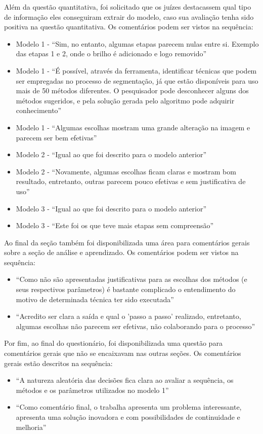 \documentclass[12pt,oneside,a4paper,english,french,spanish,brazil,]{abntex2}
\begin{document}
Além da questão quantitativa, foi solicitado que os juízes destacassem qual tipo de informação eles conseguiram extrair do modelo, caso sua avaliação tenha sido positiva na questão quantitativa. Os comentários podem ser vistos na sequência:
\begin{itemize}
    \item Modelo 1 - ``Sim, no entanto, algumas etapas parecem nulas entre si. Exemplo das etapas 1 e 2, onde o brilho é adicionado e logo removido''
    \item Modelo 1 - ``É possível, através da ferramenta, identificar técnicas que podem ser empregadas no processo de segmentação, já que estão disponíveis para uso mais de 50 métodos diferentes. O pesquisador pode desconhecer alguns dos métodos sugeridos, e pela solução gerada pelo algoritmo pode adquirir conhecimento''
    \item Modelo 1 - ``Algumas escolhas mostram uma grande alteração na imagem e parecem ser bem efetivas''
    \item Modelo 2 - ``Igual ao que foi descrito para o modelo anterior''
    \item Modelo 2 - ``Novamente, algumas escolhas ficam claras e mostram bom resultado, entretanto, outras parecem pouco efetivas e sem justificativa de uso''
    \item Modelo 3 - ``Igual ao que foi descrito para o modelo anterior''
    \item Modelo 3 - ``Este foi os que teve mais etapas sem compreensão''
\end{itemize}
	
Ao final da seção também foi disponibilizada uma área para comentários gerais sobre a seção de análise e aprendizado. Os comentários podem ser vistos na sequência:
\begin{itemize}
    \item ``Como não são apresentadas justificativas para as escolhas dos métodos (e seus respectivos parâmetros) é bastante complicado o entendimento do motivo de determinada técnica ter sido executada''
    \item ``Acredito ser clara a saída e qual o 'passo a passo' realizado, entretanto, algumas escolhas não parecem ser efetivas, não colaborando para o processo''
\end{itemize}

Por fim, ao final do questionário, foi disponibilizada uma questão para comentários gerais que não se encaixavam nas outras seções. Os comentários gerais estão descritos na sequência:
\begin{itemize}
    \item ``A natureza aleatória das decisões fica clara ao avaliar a sequência, os métodos e os parâmetros utilizados no modelo 1''
    \item ``Como comentário final, o trabalha apresenta um problema interessante, apresenta uma solução inovadora e com possibilidades de continuidade e melhoria''
\end{itemize}
\end{document}
